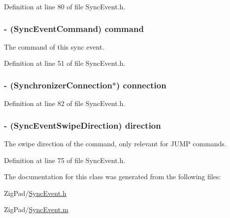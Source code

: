 Definition at line 80 of file SyncEvent.h.

\hypertarget{interface_sync_event_aa6a5afb0f81c492c56b326c711e72aff}{
\subsubsection[{command}]{\setlength{\rightskip}{0pt plus 5cm}-\/ ({\bf SyncEventCommand}) command}}
\label{interface_sync_event_aa6a5afb0f81c492c56b326c711e72aff}
The command of this sync event. 

Definition at line 51 of file SyncEvent.h.

\hypertarget{interface_sync_event_a9e3771e5997eb55dbe39b33090297c78}{
\subsubsection[{connection}]{\setlength{\rightskip}{0pt plus 5cm}-\/ ({\bf SynchronizerConnection}$\ast$) connection}}
\label{interface_sync_event_a9e3771e5997eb55dbe39b33090297c78}


Definition at line 82 of file SyncEvent.h.

\hypertarget{interface_sync_event_af2e9a1b1dcae54a6d29d4ab3ea82ac36}{
\subsubsection[{direction}]{\setlength{\rightskip}{0pt plus 5cm}-\/ ({\bf SyncEventSwipeDirection}) direction}}
\label{interface_sync_event_af2e9a1b1dcae54a6d29d4ab3ea82ac36}
The swipe direction of the command, only relevant for JUMP commands. 

Definition at line 75 of file SyncEvent.h.



The documentation for this class was generated from the following files:\begin{DoxyCompactItemize}
\item 
ZigPad/\hyperlink{_sync_event_8h}{SyncEvent.h}\item 
ZigPad/\hyperlink{_sync_event_8m}{SyncEvent.m}\end{DoxyCompactItemize}
